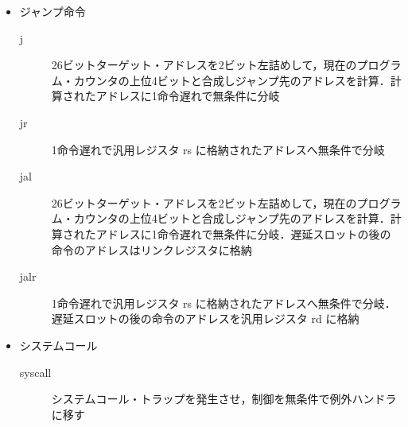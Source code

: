 \documentclass{jarticle}[11pt]
\begin{document}
\begin{itemize}
  \item ジャンプ命令
  
  \begin{description}
    \item[j] 26ビットターゲット・アドレスを2ビット左詰めして，現在のプログラム・カウンタの上位4ビットと合成しジャンプ先のアドレスを計算．計算されたアドレスに1命令遅れで無条件に分岐
    \item[jr] 1命令遅れで汎用レジスタ rs に格納されたアドレスへ無条件で分岐
    \item[jal] 26ビットターゲット・アドレスを2ビット左詰めして，現在のプログラム・カウンタの上位4ビットと合成しジャンプ先のアドレスを計算．計算されたアドレスに1命令遅れで無条件に分岐．遅延スロットの後の命令のアドレスはリンクレジスタに格納
    \item[jalr] 1命令遅れで汎用レジスタ rs に格納されたアドレスへ無条件で分岐．遅延スロットの後の命令のアドレスを汎用レジスタ rd に格納  
  \end{description} 
  
  \item システムコール　
  \begin{description}
    \item[syscall] システムコール・トラップを発生させ，制御を無条件で例外ハンドラに移す
  \end{description} 

\end{itemize}
\end{document}
